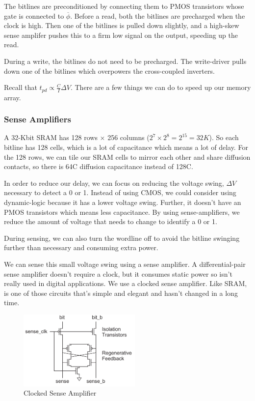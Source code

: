 \documentclass{article}
\begin{document}
The bitlines are preconditioned by connecting them to PMOS transistors whose gate is connected to $\overline{\phi}$. Before a read, both the bitlines are precharged when the clock is high. Then one of the bitlines is pulled down slightly, and a high-skew sense amplifer pushes this to a firm low signal on the output, speeding up the read. 

 During a write, the bitlines do not need to be precharged. The write-driver pulls down one of the bitlines which overpowers the cross-coupled inverters. 

Recall that $t_{pd} \propto \frac{C}{I}\Delta V$. There are a few things we can do to speed up our memory array.

\subsubsection{Sense Amplifiers}

A 32-Kbit SRAM has 128 rows $\times$ 256 columns ($2^7 \times 2^8 = 2^{15} = 32K$). So each bitline has 128 cells, which is a lot of capacitance which means a lot of delay. For the 128 rows, we can tile our SRAM cells to mirror each other and share diffusion contacts, so there is 64C diffusion capacitance instead of 128C. 

In order to reduce our delay, we can focus on reducing the voltage swing, $\Delta V$ necessary to detect a 0 or 1. Instead of using CMOS, we could consider using dynamic-logic because it has a lower voltage swing. Further, it doesn't have an PMOS transistors which means less capacitance. By using sense-amplifiers, we reduce the amount of voltage that needs to change to identify a 0 or 1. 

During sensing, we can also turn the wordline off to avoid the bitline swinging further than necessary and consuming extra power. 

We can sense  this small voltage swing using a sense amplifier. A differential-pair sense amplifier doesn't require a clock, but it consumes static power so isn't really used in digital applications. We use a clocked sense amplifier. Like SRAM, is one of those circuits that's simple and elegant and hasn't changed in a long time.

 \begin{figure}[ht!]
\centering
\includegraphics[width=60mm]{Sense.png}
\caption{Clocked Sense Amplifier}
\end{figure}
\end{document}
